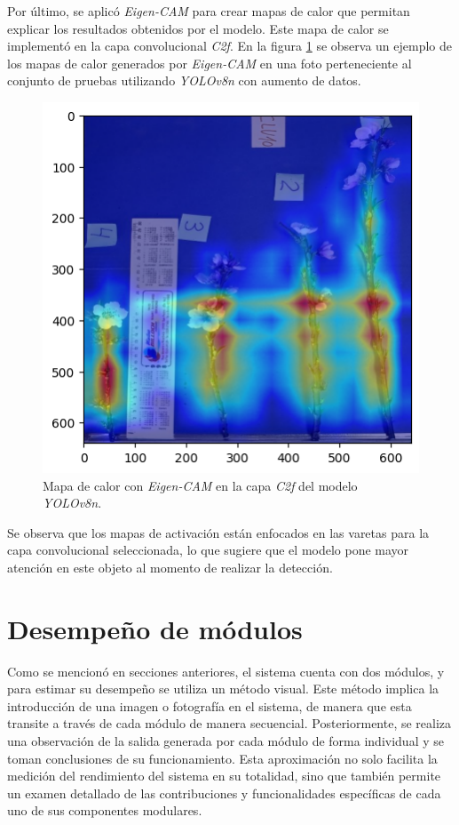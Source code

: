 Por último, se aplicó \textit{Eigen-CAM} \cite{ARTICLE:17} para crear mapas de calor que permitan explicar los resultados obtenidos por el modelo. Este mapa de calor se implementó en la capa convolucional \textit{C2f}. En la figura \ref{fig:EigenCam} se observa un ejemplo de los mapas de calor generados por \textit{Eigen-CAM} en una foto perteneciente al conjunto de pruebas utilizando \textit{YOLOv8n} con aumento de datos.

\begin{figure}[ht]
	\centering
	\includegraphics[scale=0.55]{./Figures/EigenCamEj.png}
	\caption{Mapa de calor con \textit{Eigen-CAM} en la capa \textit{C2f} del modelo \textit{YOLOv8n}.}
	\label{fig:EigenCam}
\end{figure}

Se observa que los mapas de activación están enfocados en las varetas para la capa convolucional seleccionada, lo que sugiere que el modelo pone mayor atención en este objeto al momento de realizar la detección.   

\section{Desempeño de módulos}
\label{sec:desempeñoModulos}

Como se mencionó en secciones anteriores, el sistema cuenta con dos módulos, y para estimar su desempeño se utiliza un método visual. Este método implica la introducción de una imagen o fotografía en el sistema, de manera que esta transite a través de cada módulo de manera secuencial. Posteriormente, se realiza una observación de la salida generada por cada módulo de forma individual y se toman conclusiones de su funcionamiento. Esta aproximación no solo facilita la medición del rendimiento del sistema en su totalidad, sino que también permite un examen detallado de las contribuciones y funcionalidades específicas de cada uno de sus componentes modulares.

